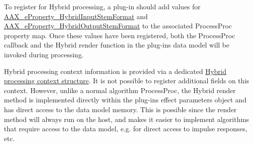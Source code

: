 To register for Hybrid processing, a plug-\/in should add values for \hyperlink{a00335_ga6571f4e41a5dd06e4067249228e2249ea33a950bc2e02d38fc3be0a0ad8cc89b1}{A\+A\+X\+\_\+e\+Property\+\_\+\+Hybrid\+Input\+Stem\+Format} and \hyperlink{a00335_ga6571f4e41a5dd06e4067249228e2249eac30a4e73772e37267dfef39ae3122705}{A\+A\+X\+\_\+e\+Property\+\_\+\+Hybrid\+Output\+Stem\+Format} to the associated Process\+Proc property map. Once these values have been registered, both the Process\+Proc callback and the Hybrid render function in the plug-\/in\textquotesingle{}s data model will be invoked during processing.

Hybrid processing context information is provided via a dedicated \hyperlink{a00121}{Hybrid processing context structure}. It is not possible to register additional fields on this context. However, unlike a normal algorithm Process\+Proc, the Hybrid render method is implemented directly within the plug-\/in\textquotesingle{}s effect parameters object and has direct access to the data model memory. This is possible since the render method will always run on the host, and makes it easier to implement algorithms that require access to the data model, e.\+g. for direct access to impulse responses, etc.

